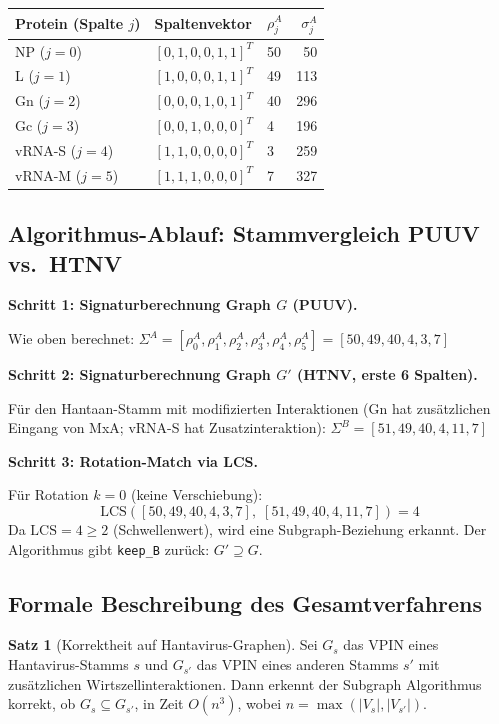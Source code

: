 ﻿\documentclass[a4paper,12pt]{article}
\theoremstyle{definition}
\newtheorem{satz}{Satz}
\begin{document}
\begin{center}
\begin{tabular}{lllr}
    \toprule
    Protein (Spalte $j$) & Spaltenvektor & $\rho_j^A$ & $\sigma_j^A$ \\
    \midrule
    NP ($j=0$) & $[0,1,0,0,1,1]^T$ & 50 & 50 \\
    L ($j=1$)  & $[1,0,0,0,1,1]^T$ & 49 & 113 \\
    Gn ($j=2$) & $[0,0,0,1,0,1]^T$ & 40 & 296 \\
    Gc ($j=3$) & $[0,0,1,0,0,0]^T$ & 4  & 196 \\
    vRNA-S ($j=4$) & $[1,1,0,0,0,0]^T$ & 3  & 259 \\
    vRNA-M ($j=5$) & $[1,1,1,0,0,0]^T$ & 7  & 327 \\
    \bottomrule
\end{tabular}
\end{center}

\subsection{Algorithmus-Ablauf: Stammvergleich PUUV vs.\ HTNV}

\textbf{Schritt 1: Signaturberechnung Graph $G$ (PUUV).}

Wie oben berechnet:
$\Sigma^A = [\rho_0^A, \rho_1^A, \rho_2^A, \rho_3^A, \rho_4^A, \rho_5^A]
= [50, 49, 40, 4, 3, 7]$

\textbf{Schritt 2: Signaturberechnung Graph $G'$ (HTNV, erste 6 Spalten).}

F\"ur den Hantaan-Stamm mit modifizierten Interaktionen (Gn hat
zus\"atzlichen Eingang von MxA; vRNA-S hat Zusatzinteraktion):
$\Sigma^B = [51, 49, 40, 4, 11, 7]$

\textbf{Schritt 3: Rotation-Match via LCS.}

F\"ur Rotation $k = 0$ (keine Verschiebung):
\[
    \mathrm{LCS}([50, 49, 40, 4, 3, 7],\; [51, 49, 40, 4, 11, 7]) = 4
\]
Da $\mathrm{LCS} = 4 \geq 2$ (Schwellenwert), wird eine Subgraph-Beziehung
erkannt. Der Algorithmus gibt \texttt{keep\_B} zur\"uck: $G' \supseteq G$.

\subsection{Formale Beschreibung des Gesamtverfahrens}

\begin{satz}[Korrektheit auf Hantavirus-Graphen]
    \label{satz:korrektheit_hanta}
    Sei $G_s$ das VPIN eines Hantavirus-Stamms $s$ und $G_{s'}$ das
    VPIN eines anderen Stamms $s'$ mit zus\"atzlichen Wirtszellinteraktionen.
    Dann erkennt der Subgraph Algorithmus korrekt, ob $G_s \subseteq G_{s'}$,
    in Zeit $O(n^3)$, wobei $n = \max(|V_s|, |V_{s'}|)$.
\end{satz}
\end{document}
